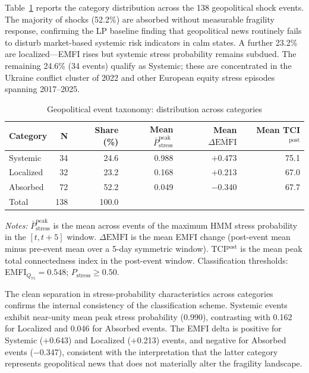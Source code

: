 \documentclass[11pt]{article}
\begin{document}
Table~\ref{tab:taxonomy_summary} reports the category distribution across the 138 geopolitical shock events. The majority of shocks (52.2\%) are absorbed without measurable fragility response, confirming the LP baseline finding that geopolitical news routinely fails to disturb market-based systemic risk indicators in calm states. A further 23.2\% are localized---EMFI rises but systemic stress probability remains subdued.
The remaining 24.6\% (34 events) qualify as Systemic; these are concentrated in the Ukraine conflict cluster of 2022 and other European equity stress episodes spanning 2017--2025.

\begin{table}[htbp]
\centering
\caption{Geopolitical event taxonomy: distribution across categories}
\label{tab:taxonomy_summary}
\begin{tabular}{lrrrrr}
\hline\hline
Category & N & Share (\%) & Mean $\bar{P}_{\text{stress}}^{\text{peak}}$ & Mean $\Delta\overline{\text{EMFI}}$ & Mean TCI$^{\text{post}}$ \\
\hline
Systemic  & 34 & 24.6 & 0.988 & $+$0.473 & 75.1 \\
Localized & 32 & 23.2 & 0.168 & $+$0.213 & 67.0 \\
Absorbed  & 72 & 52.2 & 0.049 & $-$0.340 & 67.7 \\
\hline
Total     & 138 & 100.0 & & & \\
\hline\hline
\end{tabular}
\begin{minipage}{\linewidth}
\smallskip\footnotesize
\textit{Notes:} $\bar{P}_{\text{stress}}^{\text{peak}}$ is the mean across events of the maximum HMM stress probability in the $[t, t+5]$ window.
$\Delta\overline{\text{EMFI}}$ is the mean EMFI change (post-event mean minus pre-event mean over a 5-day symmetric window).
TCI$^{\text{post}}$ is the mean peak total connectedness index in the post-event window.
Classification thresholds: EMFI$_{Q_{75}} = 0.548$; $P_{\text{stress}} \geq 0.50$.
\end{minipage}
\end{table}

The clean separation in stress-probability characteristics across categories confirms the internal consistency of the classification scheme.
Systemic events exhibit near-unity mean peak stress probability (0.990), contrasting with 0.162 for Localized and 0.046 for Absorbed events.
The EMFI delta is positive for Systemic ($+$0.643) and Localized ($+$0.213) events, and negative for Absorbed events ($-$0.347), consistent with the interpretation that the latter category represents geopolitical news that does not materially alter the fragility landscape.
\end{document}
